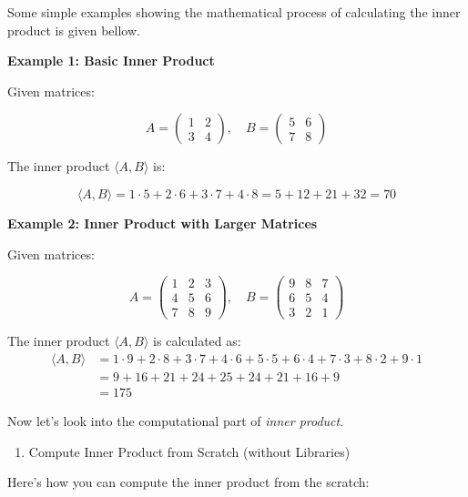 \documentclass[
  letterpaper,
  DIV=11,
  numbers=noendperiod]{scrreprt}
\providecommand{\tightlist}{%
  \setlength{\itemsep}{0pt}\setlength{\parskip}{0pt}}\usepackage{longtable,booktabs,array}
\theoremstyle{plain}
\theoremstyle{definition}
\theoremstyle{remark}
\begin{document}
Some simple examples showing the mathematical process of calculating the
inner product is given bellow.

\textbf{Example 1: Basic Inner Product}

Given matrices:

\[A = \begin{pmatrix}
1 & 2 \\
3 & 4
\end{pmatrix}, \quad
B = \begin{pmatrix}
5 & 6 \\
7 & 8
\end{pmatrix}\]

The inner product \(\langle A, B \rangle\) is:

\[\langle A, B \rangle = 1 \cdot 5 + 2 \cdot 6 + 3 \cdot 7 + 4 \cdot 8 = 5 + 12 + 21 + 32 = 70\]

\textbf{Example 2: Inner Product with Larger Matrices}

Given matrices:

\[A = \begin{pmatrix}
1 & 2 & 3 \\
4 & 5 & 6 \\
7 & 8 & 9
\end{pmatrix}, \quad
B = \begin{pmatrix}
9 & 8 & 7 \\
6 & 5 & 4 \\
3 & 2 & 1
\end{pmatrix}\]

The inner product \(\langle A, B \rangle\) is calculated as:
\begin{align*}
\langle A, B \rangle &= 1 \cdot 9 + 2 \cdot 8 + 3 \cdot 7 + 4 \cdot 6 + 5 \cdot 5 + 6 \cdot 4 + 7 \cdot 3 + 8 \cdot 2 + 9 \cdot 1\\
&= 9 + 16 + 21 + 24 + 25 + 24 + 21 + 16 + 9\\
&= 175
\end{align*}

Now let's look into the computational part of \emph{inner product}.

\begin{enumerate}
\def\labelenumi{\arabic{enumi}.}
\tightlist
\item
  Compute Inner Product from Scratch (without Libraries)
\end{enumerate}

Here's how you can compute the inner product from the scratch:
\end{document}

